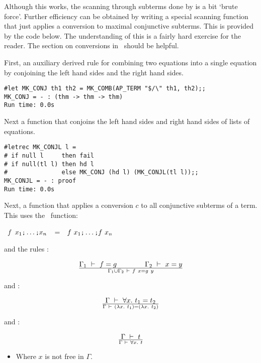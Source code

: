 Although this works, the scanning through subterms done by
 is a bit `brute force'. Further efficiency can
be obtained by writing a special scanning function that
just applies a conversion to maximal conjunctive subterms.
This is provided by the code below. 
The understanding of this is a fairly hard exercise for the reader. The
section on conversions in \DESCRIPTION\ should be helpful.

First, an auxiliary derived rule for combining two equations into
a single equation by conjoining  the left hand sides and  the
right hand sides.

\begin{session}\begin{verbatim}
#let MK_CONJ th1 th2 = MK_COMB(AP_TERM "$/\" th1, th2);;
MK_CONJ = - : (thm -> thm -> thm)
Run time: 0.0s
\end{verbatim}\end{session}

\noindent Next a function that conjoins the left hand sides and right
hand sides of lists of equations.

\begin{session}\begin{verbatim}
#letrec MK_CONJL l =
# if null l     then fail
# if null(tl l) then hd l
#               else MK_CONJ (hd l) (MK_CONJL(tl l));;
MK_CONJL = - : proof
Run time: 0.0s
\end{verbatim}\end{session}

\noindent Next, a function that applies a conversion $c$ to all
conjunctive subterms of a term. This uses the \ML\ function:

\bigskip
{}~$f$~\ml{[}$x_1\ml{;}\ldots\ml{;}x_n$\ml{]}~~=~~\ml{[}$f\ x_1\ml{;}\ldots\ml{;}f\ x_n$\ml{]}

\bigskip

\noindent and the rules :


\[ \Gamma_1 \ \vdash\  f = g \qquad\qquad \Gamma_2\ \vdash\  x = y \over
\Gamma_1 \cup \Gamma_2 \ \vdash\  f\ x = g\ y\]

\noindent and :


\[ \Gamma \ \vdash\  \forall x.\ t_1 = t_2 \over
\Gamma \ \vdash\  (\lambda x.\ t_1) = (\lambda x.\ t_2)\]

\noindent and :

$$\Gamma\ \vdash\  t\over\Gamma\ \vdash\ \forall x.\  t$$
\begin{itemize}
\item Where $x$ is not free in $\Gamma$.
\end{itemize}


